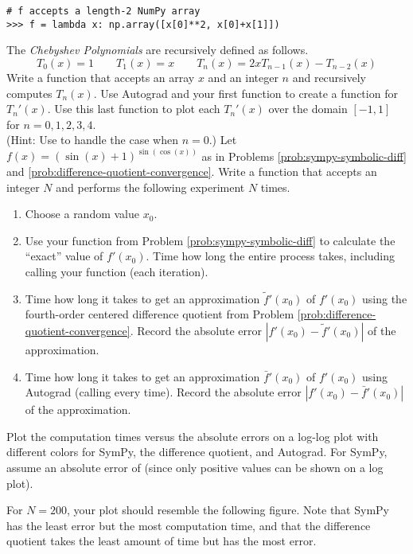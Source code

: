 \begin{lstlisting}
# f accepts a length-2 NumPy array
>>> f = lambda x: np.array([x[0]**2, x[0]+x[1]])
\end{lstlisting}
The \emph{Chebyshev Polynomials} are recursively defined as follows.
\[
T_0(x) = 1\qquad T_1(x) = x\qquad T_n(x) = 2xT_{n-1}(x) - T_{n-2}(x)
\]
Write a function that accepts an array $x$ and an integer $n$ and recursively computes $T_n(x)$.
Use Autograd and your first function to create a function for $T_n'(x)$.
Use this last function to plot each $T_n'(x)$ over the domain $[-1, 1]$ for $n=0,1,2,3,4$.
\\(Hint: Use  to handle the case when $n = 0$.)
Let $f(x) = (\sin(x) + 1)^{\sin(\cos(x))}$ as in Problems \ref{prob:sympy-symbolic-diff} and \ref{prob:difference-quotient-convergence}.
Write a function that accepts an integer $N$ and performs the following experiment $N$ times.
\begin{enumerate}
\item Choose a random value $x_0$.
\item Use your function from Problem \ref{prob:sympy-symbolic-diff} to calculate the ``exact'' value of $f'(x_0)$.
Time how long the entire process takes, including calling your function (each iteration).
\item Time how long it takes to get an approximation $\tilde{f}'(x_0)$ of $f'(x_0)$ using the fourth-order centered difference quotient from Problem \ref{prob:difference-quotient-convergence}.
Record the absolute error $|f'(x_0) - \tilde{f}'(x_0)|$ of the approximation.
\item Time how long it takes to get an approximation $\bar{f}'(x_0)$ of $f'(x_0)$ using Autograd (calling  every time).
Record the absolute error $|f'(x_0) - \bar{f}'(x_0)|$ of the approximation.
\end{enumerate}

Plot the computation times versus the absolute errors on a log-log plot with different colors for SymPy, the difference quotient, and Autograd.
For SymPy, assume an absolute error of  (since only positive values can be shown on a log plot).

For $N=200$, your plot should resemble the following figure.
Note that SymPy has the least error but the most computation time, and that the difference quotient takes the least amount of time but has the most error.

